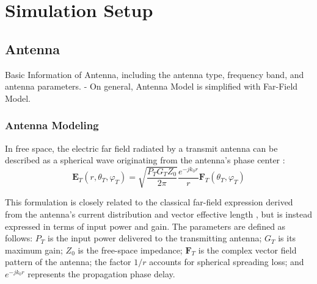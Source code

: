 \chapter{Simulation Setup}
% 
\section{Antenna}


Basic Information of Antenna, including the antenna type, frequency band, and antenna parameters.
- On general, Antenna Model is simplified with Far-Field Model. 

\subsection{Antenna Modeling}



In free space, the electric far field radiated by a transmit antenna can be described as a spherical wave originating from the antenna's phase center \cite{NVIDIACorporation2026}:
\begin{equation}
\mathbf{E}_T(r, \theta_T, \varphi_T) = \sqrt{\frac{P_T G_T Z_0}{2\pi}} \frac{e^{-jk_0 r} }{r}\mathbf{F}_T(\theta_T, \varphi_T)
\end{equation}

This formulation is closely related to the classical far-field expression derived from the antenna's current distribution and vector effective length \cite{ConstantineABalanis2016}, but is instead expressed in terms of input power and gain. The parameters are defined as follows: $P_T$ is the input power delivered to the transmitting antenna; $G_T$ is its maximum gain; $Z_0$ is the free-space impedance; $\mathbf{F}_T$ is the complex vector field pattern of the antenna; the factor $1/r$ accounts for spherical spreading loss; and $e^{-jk_0 r}$ represents the propagation phase delay.

